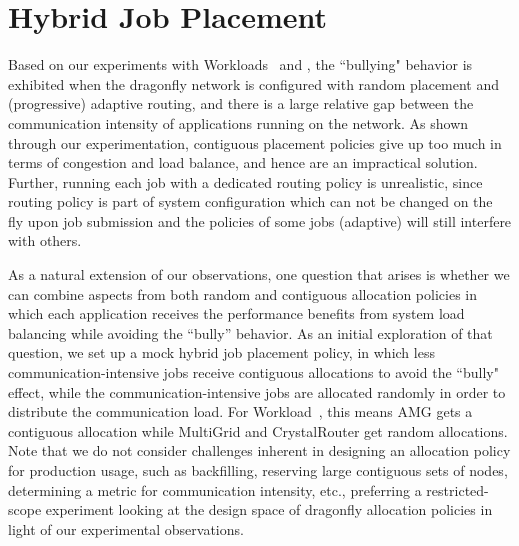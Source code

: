 \section{Hybrid Job Placement}
\label{sec: hybrid placement}

Based on our experiments with Workloads~ and , the ``bullying" behavior is
exhibited when the dragonfly network is configured with random placement and
(progressive) adaptive routing, and there is a large relative gap between the
communication intensity of applications running on the network.
As shown through our experimentation, contiguous placement policies give up too
much in terms of congestion and load balance, and hence are an impractical
solution. Further, running each job with a dedicated routing policy is unrealistic, 
since routing policy is part of system configuration which can not be changed
on the fly upon job submission and the policies of some jobs (adaptive)
will still interfere with others.




As a natural extension of our observations, one question that arises is whether
we can combine aspects from both random and contiguous allocation policies in
which each application receives the performance benefits from system load
balancing while avoiding the ``bully'' behavior. As an initial exploration of
that question, we set up a mock hybrid job placement policy, in which less
communication-intensive jobs receive contiguous allocations to avoid the
``bully" effect, while the communication-intensive jobs are allocated randomly
in order to distribute the communication load. For Workload~, this
means AMG gets a contiguous allocation while MultiGrid and CrystalRouter get
random allocations. Note that we do not consider challenges inherent in
designing an allocation policy for production usage, such as backfilling,
reserving large contiguous sets of nodes, determining a metric for
communication intensity, etc., preferring a restricted-scope experiment
looking at the design space of dragonfly allocation policies in light of our experimental
observations.


